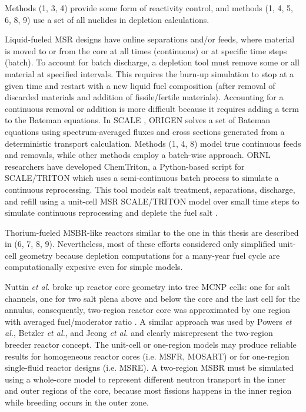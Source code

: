 Methods (1, 3, 4) provide some form of reactivity control, and methods (1, 4, 5, 6, 8, 9) use a set of all nuclides in depletion calculations. 

Liquid-fueled \gls{MSR} designs have online separations and/or feeds, where material is moved to or from the core at all times (continuous) or at specific time steps (batch). To account for batch discharge, a depletion tool must remove some or all material at specified intervals. This requires the burn-up simulation to stop at a given time and restart with a new liquid fuel composition (after removal of discarded materials and addition of fissile/fertile materials). Accounting for a continuous removal or addition is more difficult because it requires adding a term to the Bateman equations. In SCALE \cite{bowman_scale_2011}, ORIGEN \cite{gauld_isotopic_2011} solves a set of Bateman equations using spectrum-averaged fluxes and cross sections generated from a deterministic transport calculation. Methods (1, 4, 8) model true continuous feeds and removals, while other methods employ a batch-wise approach. \gls{ORNL} researchers have developed ChemTriton, a Python-based script for SCALE/TRITON which uses a semi-continuous batch process to simulate a continuous reprocessing. This tool models salt treatment, separations, discharge, and refill using a unit-cell \gls{MSR} SCALE/TRITON model over small time steps to simulate continuous reprocessing and deplete the fuel salt \cite{powers_new_2013}.

Thorium-fueled \gls{MSBR}-like reactors similar to the one in this thesis are described in (6, 7, 8, 9). Nevertheless, most of these efforts considered only simplified unit-cell geometry because depletion computations for a many-year fuel cycle are computationally expesive even for simple models. 

Nuttin \emph{et al.} broke up reactor core geometry into tree \gls{MCNP} cells: one for salt channels, one for two salt plena above and below the core and the last cell for the annulus, consequently, two-region reactor core was approximated by one region with averaged fuel/moderator ratio \cite{nuttin_potential_2005}.  A similar approach was used by Powers \emph{et al.}, Betzler \emph{et al.}, and Jeong \emph{et al.} \cite{powers_new_2013,powers_inventory_2014,betzler_modeling_2016, betzler_molten_2017, jeong_development_2014, jeong_equilibrium_2016} and clearly misrepresent the two-region breeder reactor concept. The unit-cell or one-region models may produce reliable results for homogeneous reactor cores (i.e. \gls{MSFR}, \gls{MOSART}) or for one-region single-fluid reactor designs (i.e. \gls{MSRE}). A two-region \gls{MSBR} must be simulated using a whole-core model to represent different neutron transport in the inner and outer regions of the core, because most fissions happens in the inner region while breeding occurs in the outer zone.  

